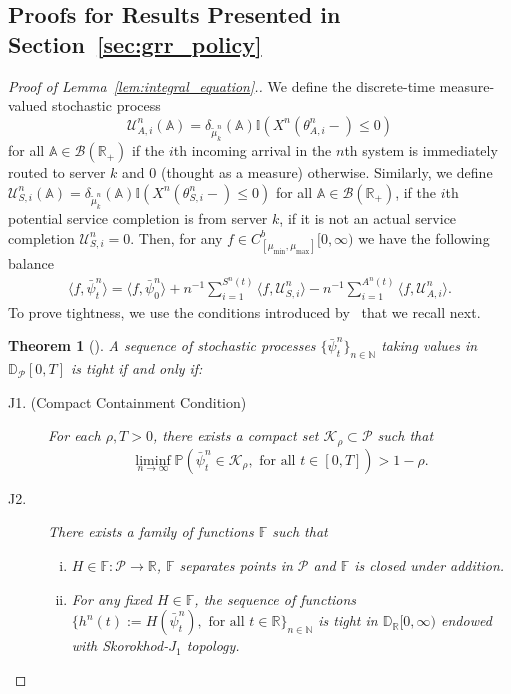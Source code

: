 \documentclass[a4paper,11pt,twoside]{article}
\numberwithin{equation}{section}
\numberwithin{figure}{section}
\theoremstyle{plain}
\newtheorem{theorem}{Theorem}[section]
\newcommand{\cB}{\mathcal{B}}
\newcommand{\cP}{\mathcal{P}}
\newcommand{\cU}{\mathcal{U}}
\newcommand{\AAA}{\mathbb{A}}
\newcommand{\DD}{\mathbb{D}}
\newcommand{\FF}{\mathbb{F}}
\newcommand{\II}{\mathbb{I}}
\newcommand{\NN}{\mathbb{N}}
\newcommand{\PP}{\mathbb{P}}
\newcommand{\RR}{\mathbb{R}}
\newcommand{\1}{\mathbbm{1}}
\begin{document}
\subsection{Proofs for Results Presented in Section~\ref{sec:grr_policy}}\label{app:grr_policy}
\begin{proof}[Proof of Lemma~\ref{lem:integral_equation}.]
We define the discrete-time measure-valued stochastic process $$
\cU_{A,i}^n(\AAA)=\delta_{\tilde{\mu}_k^n}(\AAA)\II(X^n(\theta_{A,i}^n-)\leq 0)$$ for all $\AAA\in \cB(\RR_+)$ if the $i$th incoming arrival in the $n$th system is immediately routed to server $k$ and $0$ (thought as a measure) otherwise. Similarly, we define $\cU_{S,i}^n(\AAA)=\delta_{\tilde{\mu}_k^n}(\AAA)\II(X^n(\theta_{S,i}^n-)\leq 0)$ for all $\AAA\in \cB(\RR_+)$, if the $i$th potential service completion is from server $k$, if it is not an actual service completion $\cU_{S,i}^n=0$.  Then, for any $f\in C_{[\mu_{\min},\mu_{\max}]}^b[0,\infty)$ we have the following balance 
 \begin{align}
    \langle f, \bar{\psi}^{n}_t\rangle = \langle f, \bar{\psi}_0^{n}\rangle + n^{-1}\sum_{i=1}^{S^n(t)} \langle f, \cU_{S,i}^n \rangle -n^{-1}\sum_{i=1}^{A^n(t)}\langle f, \cU_{A,i}^n \rangle
    \label{eq:idle_balance}.
 \end{align}
To prove tightness, we use the conditions introduced by~\cite{jak86} that we recall next.
 \begin{theorem}[\cite{jak86}]
   A sequence of stochastic processes $\{\bar{\psi}_t^{n}\}_{n\in\NN}$ taking values in $\DD_\cP[0,T]$ is tight if and only if:
   \begin{description}
   \item[J1. (Compact Containment Condition)] For each $\rho, T>0$, there exists a compact set $\mathcal{K}_\rho\subset \cP$ such that
   \[
 	\liminf_{n\to \infty}\PP(\bar{\psi}^{n}_t\in \mathcal{K}_\rho, \text{ for all }t\in[0,T])>1-\rho.  
   \]
   \item[J2.] There exists a family of functions $\mathbb{F}$ such that 
   \begin{enumerate}[i.]
   \item $H\in \FF: \cP\to \RR$, $\FF$ separates points in $\cP$ and $\FF$ is closed under addition.
   \item For any fixed $H\in\mathbb{F}$, the sequence of functions $\{h^n(t):=H(\bar{\psi}^{n}_t), \mbox{ for all }t \in \RR\}_{n\in \NN}$ is tight in $\DD_{\RR}[0,\infty)$ endowed with Skorokhod-$J_1$ topology. 
   \end{enumerate}
   \end{description}
   \end{theorem}
   

\end{proof}
\end{document}
